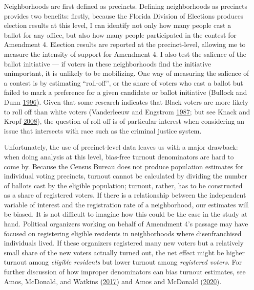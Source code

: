 \documentclass[
  12pt,
]{article}
\begin{document}
Neighborhoods are first defined as precincts. Defining neighborhoods as precincts provides two benefits: firstly, because the Florida Division of Elections produces election results at this level, I can identify not only how many people cast a ballot for any office, but also how many people participated in the contest for Amendment 4. Election results are reported at the precinct-level, allowing me to measure the intensity of support for Amendment 4. I also test the salience of the ballot initiative --- if voters in these neighborhoods find the initiative unimportant, it is unlikely to be mobilizing. One way of measuring the salience of a contest is by estimating ``roll-off'', or the share of voters who cast a ballot but failed to mark a preference for a given candidate or ballot initiative (Bullock and Dunn \protect\hyperlink{ref-Bullock1996}{1996}). Given that some research indicates that Black voters are more likely to roll off than white voters (Vanderleeuw and Engstrom \protect\hyperlink{ref-Vanderleeuw1987}{1987}; but see Knack and Kropf \protect\hyperlink{ref-Knack2008}{2008}), the question of roll-off is of particular interest when considering an issue that intersects with race such as the criminal justice system.

Unfortunately, the use of precinct-level data leaves us with a major drawback: when doing analysis at this level, bias-free turnout denominators are hard to come by. Because the Census Bureau does not produce population estimates for individual voting precincts, turnout cannot be calculated by dividing the number of ballots cast by the eligible population; turnout, rather, has to be constructed as a share of registered voters. If there is a relationship between the independent variable of interest and the registration rate of a neighborhood, our estimates will be biased. It is not difficult to imagine how this could be the case in the study at hand. Political organizers working on behalf of Amendment 4's passage may have focused on registering eligible residents in neighborhoods where disenfranchised individuals lived. If these organizers registered many new voters but a relatively small share of the new voters actually turned out, the net effect might be higher turnout among \emph{eligible residents} but lower turnout among \emph{registered voters}. For further discussion of how improper denominators can bias turnout estimates, see Amos, McDonald, and Watkins (\protect\hyperlink{ref-Amos2017}{2017}) and Amos and McDonald (\protect\hyperlink{ref-Amos2020}{2020}).
\end{document}
